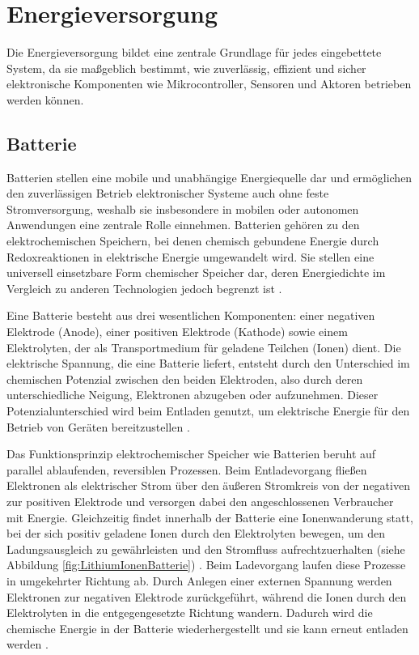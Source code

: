 \section{Energieversorgung}%
\label{cha:Energieversorgung}
	
Die Energieversorgung bildet eine zentrale Grundlage für jedes eingebettete System, da sie maßgeblich bestimmt, wie zuverlässig, effizient und sicher elektronische Komponenten wie Mikrocontroller, Sensoren und Aktoren betrieben werden können.

\subsection{Batterie}%
\label{cha:Batterie}

Batterien stellen eine mobile und unabhängige Energiequelle dar und ermöglichen den zuverlässigen Betrieb elektronischer Systeme auch ohne feste Stromversorgung, weshalb sie insbesondere in mobilen oder autonomen Anwendungen eine zentrale Rolle einnehmen.
Batterien gehören zu den elektrochemischen Speichern, bei denen chemisch gebundene Energie durch Redoxreaktionen in elektrische Energie umgewandelt wird. Sie stellen eine universell einsetzbare Form chemischer Speicher dar, deren Energiedichte im Vergleich zu anderen Technologien jedoch begrenzt ist \autocite{Kurzweil2015}.

Eine Batterie besteht aus drei wesentlichen Komponenten: einer negativen Elektrode (Anode), einer positiven Elektrode (Kathode) sowie einem Elektrolyten, der als Transportmedium für geladene Teilchen (Ionen) dient. Die elektrische Spannung, die eine Batterie liefert, entsteht durch den Unterschied im chemischen Potenzial zwischen den beiden Elektroden, also durch deren unterschiedliche Neigung, Elektronen abzugeben oder aufzunehmen. Dieser Potenzialunterschied wird beim Entladen genutzt, um elektrische Energie für den Betrieb von Geräten bereitzustellen \autocite{Kurzweil2015,BatteryEssentials2025}.

Das Funktionsprinzip elektrochemischer Speicher wie Batterien beruht auf parallel ablaufenden, reversiblen Prozessen. Beim Entladevorgang fließen Elektronen als elektrischer Strom über den äußeren Stromkreis von der negativen zur positiven Elektrode und versorgen dabei den angeschlossenen Verbraucher mit Energie. Gleichzeitig findet innerhalb der Batterie eine Ionenwanderung statt, bei der sich positiv geladene Ionen durch den Elektrolyten bewegen, um den Ladungsausgleich zu gewährleisten und den Stromfluss aufrechtzuerhalten (siehe Abbildung \ref{fig:LithiumIonenBatterie}) \autocite{Kurzweil2015,BatteryEssentials2025}. Beim Ladevorgang laufen diese Prozesse in umgekehrter Richtung ab. Durch Anlegen einer externen Spannung werden Elektronen zur negativen Elektrode zurückgeführt, während die Ionen durch den Elektrolyten in die entgegengesetzte Richtung wandern. Dadurch wird die chemische Energie in der Batterie wiederhergestellt und sie kann erneut entladen werden \autocite{Kurzweil2015,BatteryEssentials2025}.

